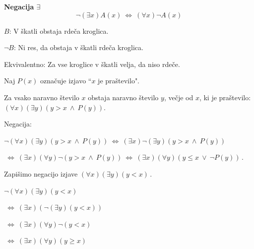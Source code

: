 \documentclass[11pt,paper=b5,footinclude,headinclude]{scrbook} %
\newcounter{example}
\def\ali {{~\vee~}}
\def\inn {{~\wedge~}}
\def\sledi {{~\Rightarrow~}}
\def\cee {{~\Leftrightarrow~}}
\begin{document}
\medskip

\noindent\textbf{ Negacija $\exists$}
$$\neg  (\exists x)A(x) \cee (\forall x) \neg A(x)$$

\medskip
\begin{example*}

$B$: V škatli obstaja rdeča kroglica.

$\neg B$: Ni res, da obstaja v škatli rdeča kroglica.

Ekvivalentno: Za vse kroglice v škatli velja, da niso rdeče.\end{example*}


%
%
%
%
%
%
%
%
%
%
%
%
%
\begin{example*}

Naj $P(x)$ označuje izjavo ``$x$ je praštevilo".

Za vsako naravno število $x$ obstaja naravno število $y$, večje od $x$, ki je praštevilo:
  $(\forall x)(\exists y)(y>x\inn P(y))$.

  Negacija:

  $\neg (\forall x)(\exists y)(y>x\inn P(y)) \cee(\exists  x)\neg (\exists y)(y>x\inn P(y))$

  $\cee(\exists  x)(\forall  y)\neg (y>x\inn P(y))\cee(\exists  x)(\forall  y)(y\le x\ali \neg P(y))\,.$\end{example*}

\bigskip
\begin{example*}
Zapišimo negacijo izjave
  $(\forall x)(\exists y)(y<x)\,.$

  $\neg(\forall x)(\exists y)(y<x)$

  $\cee (\exists x)(\neg(\exists y)(y<x))$

  $\cee (\exists x)(\forall y)\neg(y<x)$

  $\cee (\exists x)(\forall y)(y\ge x)$
  \end{example*}
\end{document}
